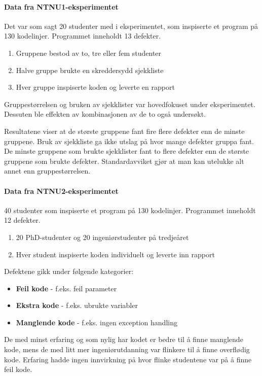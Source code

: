 \paragraph{Data fra NTNU1-eksperimentet}

Det var som sagt 20 studenter med i eksperimentet, som inspiserte et
program på 130 kodelinjer. Programmet inneholdt 13 defekter.

\begin{enumerate}[1.]
\item
  Gruppene bestod av to, tre eller fem studenter
\item
  Halve gruppe brukte en skreddersydd sjekkliste
\item
  Hver gruppe inspiserte koden og leverte en rapport
\end{enumerate}
Gruppestørrelsen og bruken av sjekklister var hovedfokuset under
eksperimentet. Dessuten ble effekten av kombinasjonen av de to også
undersøkt.

Resultatene viser at de største gruppene fant fire flere defekter enn de
minste gruppene. Bruk av sjekkliste ga ikke utslag på hvor mange
defekter gruppa fant. De minste gruppene som brukte sjekklister fant to
flere defekter enn de største gruppene som brukte defekter.
Standardavviket gjør at man kan utelukke alt annet enn gruppestørrelsen.

\paragraph{Data fra NTNU2-eksperimentet}

40 studenter som inspiserte et program på 130 kodelinjer. Programmet
inneholdt 12 defekter.

\begin{enumerate}[1.]
\item
  20 PhD-studenter og 20 ingeniørstudenter på tredjeåret
\item
  Hver student inspiserte koden individuelt og leverte inn rapport
\end{enumerate}
Defektene gikk under følgende kategorier:

\begin{itemize}
\item
  \textbf{Feil kode} - f.eks. feil parameter
\item
  \textbf{Ekstra kode} - f.eks. ubrukte variabler
\item
  \textbf{Manglende kode} - f.eks. ingen exception handling
\end{itemize}
De med minst erfaring og som nylig har kodet er bedre til å finne
manglende kode, mens de med litt mer ingeniørutdanning var flinkere til
å finne overflødig kode. Erfaring hadde ingen innvirkning på hvor flinke
studentene var på å finne feil kode.

